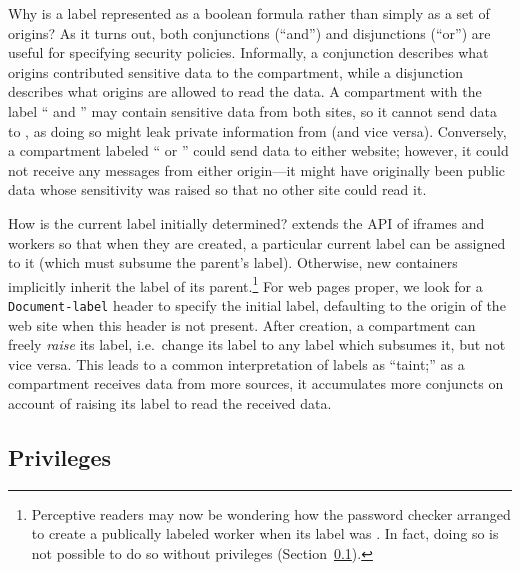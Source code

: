 %
Why is a label represented as a boolean formula rather than simply
as a set of origins?
%
As it turns out, both conjunctions (``and'')
and disjunctions (``or'') are useful for specifying security policies.
%
Informally, a conjunction describes what origins contributed sensitive data
to the compartment, while a disjunction describes what origins are allowed
to read the data.
%
A compartment with the label `` and ''
may contain sensitive data from both sites, so it cannot send data to
, as doing so might leak private information from
 (and vice versa).
%
Conversely, a compartment labeled `` or ''
could send data to either website; however, it could not receive any
messages from either origin---it might have originally been public data
whose sensitivity was raised so that no other site could read it.

How is the current label initially determined?
%
\sys{} extends the API of iframes and workers so that when they are
created, a particular current label can be assigned to it (which
must subsume the parent's label).  Otherwise, new containers implicitly
inherit the label of its parent.\footnote{Perceptive readers may now be wondering how
the password checker arranged to create a publically labeled worker
when its label was .  In fact, doing so is not possible
to do so without privileges (Section~\ref{sec:privileges}).}
%
For web pages proper, we look for a {\tt Document-label} header to
specify the initial label, defaulting to the origin of the web site when
this header is not present.
%
After creation, a compartment can freely \emph{raise} its label, i.e.\
change its label to any label which subsumes it, but not vice versa.
%
This leads to a common interpretation of labels as ``taint;'' as
a compartment receives data from more sources, it accumulates more
conjuncts on account of raising its label to read the received data.

\subsection{Privileges}
\label{sec:privileges}


